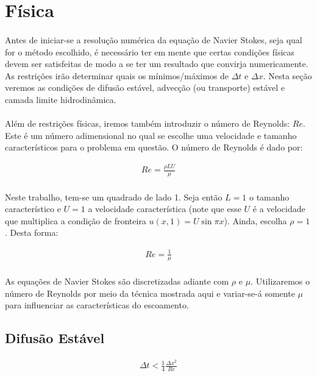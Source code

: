 \documentclass[fisica.tex]{subfiles}
\begin{document}
\section{Física}
\paragraph{} Antes de iniciar-se a resolução numérica da equação de Navier Stokes, seja qual for o método escolhido, é necessário ter em mente que certas condições físicas devem ser satisfeitas de modo a se ter um resultado que convirja numericamente. As restrições irão determinar quais os mínimos/máximos de $\Delta t$ e $\Delta x$. Nesta seção veremos as condições de difusão estável, advecção (ou transporte) estável e camada limite hidrodinâmica.

\paragraph{} Além de restrições físicas, iremos também introduzir o número de Reynolds: $\mathit{Re}$. Este é um número adimensional no qual se escolhe uma velocidade e tamanho característicos para o problema em questão. O número de Reynolds é dado por:

\begin{eqnarray}
\mathit{Re}=\frac{\rho L U}{\mu}
\end{eqnarray}

\paragraph{} Neste trabalho, tem-se um quadrado de lado 1. Seja então $L=1$ o tamanho característico e $U=1$ a velocidade característica (note que esse $U$ é a velocidade que multiplica a condição de fronteira $u(x,1)=U\sin{\pi x}$). Ainda, escolha $\rho = 1$. Desta forma:

\begin{eqnarray}
\mathit{Re}=\frac{1}{\mu}
\end{eqnarray}
 
\paragraph{} As equações de Navier Stokes são discretizadas adiante com $\rho$ e $\mu$. Utilizaremos o número de Reynolds por meio da técnica mostrada aqui e variar-se-á somente $\mu$ para influenciar as características do escoamento.

\subsection{Difusão Estável}
\begin{eqnarray}
\Delta t < \frac{1}{4}\frac{\Delta x^2}{\mathit{Re}}
\end{eqnarray}
\end{document}
